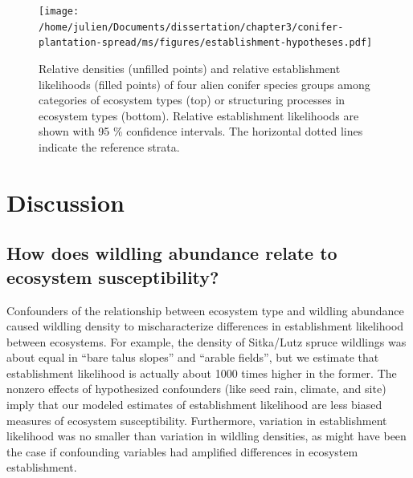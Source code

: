 \documentclass[
]{article}
\begin{document}
\newpage
\begin{landscape}

\begin{figure}
\centering
\texttt{[image: /home/julien/Documents/dissertation/chapter3/conifer-plantation-spread/ms/figures/establishment-hypotheses.pdf]}
\caption{\label{fig:establishment-hypotheses}Relative densities (unfilled points) and relative establishment likelihoods (filled points) of four alien conifer species groups among categories of ecosystem types (top) or structuring processes in ecosystem types (bottom). Relative establishment likelihoods are shown with 95 \% confidence intervals. The horizontal dotted lines indicate the reference strata.}
\end{figure}

\end{landscape}
\newpage

\hypertarget{discussion}{%
\section{Discussion}\label{discussion}}

\hypertarget{how-does-wildling-abundance-relate-to-ecosystem-susceptibility}{%
\subsection{How does wildling abundance relate to ecosystem susceptibility?}\label{how-does-wildling-abundance-relate-to-ecosystem-susceptibility}}

Confounders of the relationship between ecosystem type and wildling abundance caused wildling density to mischaracterize differences in establishment likelihood between ecosystems.
For example, the density of Sitka/Lutz spruce wildlings was about equal in ``bare talus slopes'' and ``arable fields'', but we estimate that establishment likelihood is actually about 1000 times higher in the former.
The nonzero effects of hypothesized confounders (like seed rain, climate, and site) imply that our modeled estimates of establishment likelihood are less biased measures of ecosystem susceptibility.
Furthermore, variation in establishment likelihood was no smaller than variation in wildling densities, as might have been the case if confounding variables had amplified differences in ecosystem establishment.
\end{document}
